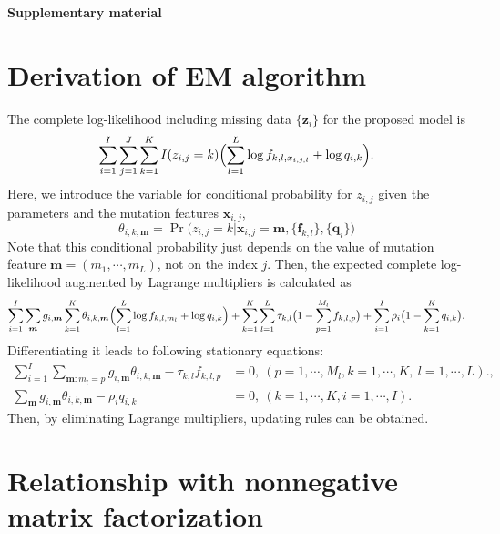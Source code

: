 \documentclass{article}
\begin{document}

\vspace*{1.0cm}
{\LARGE \bf Supplementary material}
\vspace*{0.25cm}


\section*{Derivation of EM algorithm}


The complete log-likelihood including missing data $\{ \bm{z}_i \}$ for the proposed model is
\begin{equation*}
\sum_{i = 1}^I \sum_{j=1}^J \sum_{k=1}^K I(z_{i,j} = k) \Bigl( \sum_{l = 1}^L \log f_{k, l, x_{i,j,l}} + \log q_{i,k} \Bigr).
\end{equation*}
Here, we introduce the variable for conditional probability for $z_{i,j}$ given the parameters and the mutation features $\bm{x}_{i,j}$,
\begin{equation*}
\theta_{i,k, \bm{m}} = \Pr \bigl( z_{i,j} = k \big| \bm{x}_{i, j} = \bm{m}, \{ \bm{f}_{k, l} \}, \{  \bm{q}_i \} \bigr)
\end{equation*}
Note that this conditional probability just depends on the value of mutation feature $\bm{m} = (m_1, \cdots, m_L)$, not on the index $j$.
Then, the expected complete log-likelihood augmented by Lagrange multipliers is calculated as
\begin{equation*}
\sum_{i=1}^I \sum_{\bm{m}} g_{i, \bm{m} } \sum_{k=1}^K \theta_{i, k, \bm{m}}   \Bigl( \sum_{l = 1}^L \log f_{k, l, m_l} + \log q_{i,k} \Bigr)
+ \sum_{k=1}^K \sum_{l=1}^L \tau_{k,l} \bigl( 1 - \sum_{p=1}^{M_l} f_{k,l,p} \bigr)
+ \sum_{i=1}^I \rho_i \bigl( 1 - \sum_{k=1}^K q_{i,k} \bigr).
\end{equation*}
Differentiating it leads to following stationary equations: 
\begin{align*}
\sum_{i=1}^I \sum_{\bm{m}: m_l = p} g_{i, \bm{m}} \theta_{i,k,\bm{m}} - \tau_{k,l} f_{k,l,p} & = 0,\ (p=1, \cdots, M_l, k=1, \cdots, K,\ l=1, \cdots, L)., \\
\sum_{\bm{m}} g_{i,\bm{m}} \theta_{i,k,\bm{m}} - \rho_i q_{i, k} & = 0,\ (k = 1, \cdots, K, i = 1, \cdots, I).
\end{align*}
Then, by eliminating Lagrange multipliers, updating rules can be obtained.



\section*{Relationship with nonnegative matrix factorization}
\end{document}
